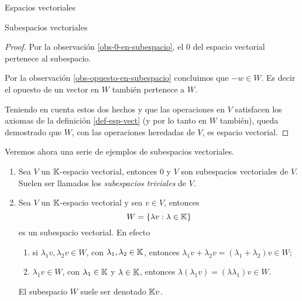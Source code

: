 \begin{chapter}{Espacios vectoriales}
\begin{section}{Subespacios vectoriales}
\begin{proof}
        Por la observación \ref{obs-0-en-subespacio}, el $0$ del espacio vectorial pertenece al subespacio. 
        
       Por la observación  \ref{obs-opuesto-en-subespacio} concluimos que $-w\in W$. Es decir el opuesto de un vector en $W$ también pertenece a $W$. 
        
        Teniendo en cuenta estos dos hechos y que las operaciones en $V$ satisfacen los axiomas de la definición \ref{def-esp-vect} (y por lo tanto en $W$ también),  queda demostrado que $W$, con las operaciones heredadas de $V$, es espacio vectorial.  
    \end{proof}



\begin{ejemplo*} Veremos ahora una serie de ejemplos de subespacios vectoriales.
    \begin{enumerate}
        \item Sea $V$ un $\mathbb K$-espacio vectorial, entonces $0$ y $V$ son subespacios vectoriales de $V$. Suelen ser llamados los \textit{subespacios triviales} de $V$.
        
        \item Sea $V$ un $\mathbb K$-espacio vectorial y sea $v \in V$, entonces
        $$
        W = \{\lambda v: \lambda \in \mathbb K \}
        $$
        es un subespacio vectorial. En  efecto
        \begin{enumerate}
            \item si $\lambda_1v,\lambda_2v \in W$, con $\lambda_1,\lambda_2 \in \mathbb K$,  entonces $\lambda_1v + \lambda_2v = (\lambda_1+\lambda_2)v \in W$;
            \item  $\lambda_1v \in W$, con $\lambda_1 \in \mathbb K$ y $\lambda \in \mathbb K$,  entonces $\lambda(\lambda_1v) = (\lambda \lambda_1)v \in W$.
        \end{enumerate}
        El subespacio $W$ suele ser denotado $\mathbb K v$.
    

\end{enumerate}
\end{ejemplo*}
\end{section}
\end{chapter}
